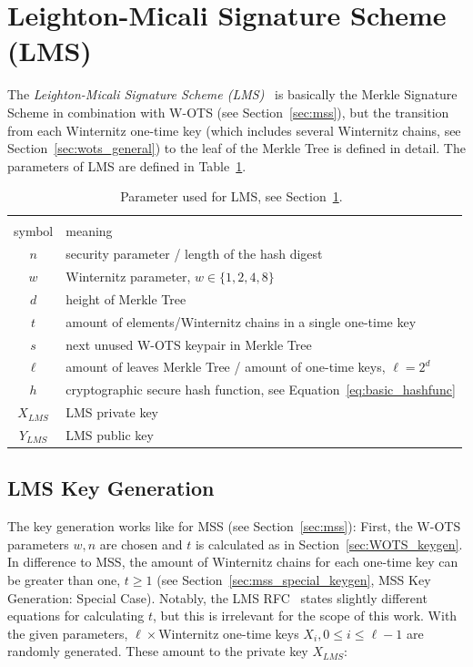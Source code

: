 \section{Leighton-Micali Signature Scheme (LMS)}
\label{sec:lms}
The \textit{Leighton-Micali Signature Scheme (LMS)}~\cite{LMS_RFC8554} is basically the Merkle Signature Scheme in combination with W-OTS (see Section~\ref{sec:mss}), but the transition from each Winternitz one-time key (which includes several Winternitz chains, see Section~\ref{sec:wots_general}) to the leaf of the Merkle Tree is defined in detail. 
The parameters of LMS are defined in Table~\ref{table:lms_param}.

\begin{table}
\centering
\begin{tabular}{c l} 
 \hline\noalign{\smallskip}
 \multicolumn{2}{c}{\textbf{LMS Parameter}} \\
 symbol & meaning \\ 
 \hline\noalign{\smallskip}
 $n$ & security parameter / length of the hash digest \\
 $w$ & Winternitz parameter, $w \in \{1,2,4,8\}$ \\ %
 $d$ & height of Merkle Tree \\
 $t$ & amount of elements/Winternitz chains in a single one-time key \\
 $s$ & next unused W-OTS keypair in Merkle Tree \\
 $\ell$ & amount of leaves Merkle Tree / amount of one-time keys, $\ell = 2^d$ \\
 $h$ & cryptographic secure hash function, see Equation~\ref{eq:basic_hashfunc} \\
 $X_{LMS}$ & LMS private key \\
 $Y_{LMS}$ & LMS public key \\
 \hline
\end{tabular}
\caption{Parameter used for LMS, see Section~\ref{sec:lms}.~\cite{LMS_RFC8554}}
\label{table:lms_param}
\end{table}

\subsection{LMS Key Generation}
The key generation works like for MSS (see Section~\ref{sec:mss}): First, the W-OTS parameters $w, n$ are chosen and $t$ is calculated as in Section~\ref{sec:WOTS_keygen}. In difference to MSS, the amount of Winternitz chains for each one-time key can be greater than one, $t \geq 1$ (see Section~\ref{sec:mss_special_keygen}, MSS Key Generation: Special Case).
Notably, the LMS RFC~\cite{LMS_RFC8554} states slightly different equations for calculating $t$, but this is irrelevant for the scope of this work. 
With the given parameters, $\ell \times$Winternitz one-time keys $X_i, 0 \leq i \leq \ell-1$ are randomly generated. These amount to the private key $X_{LMS}$:

